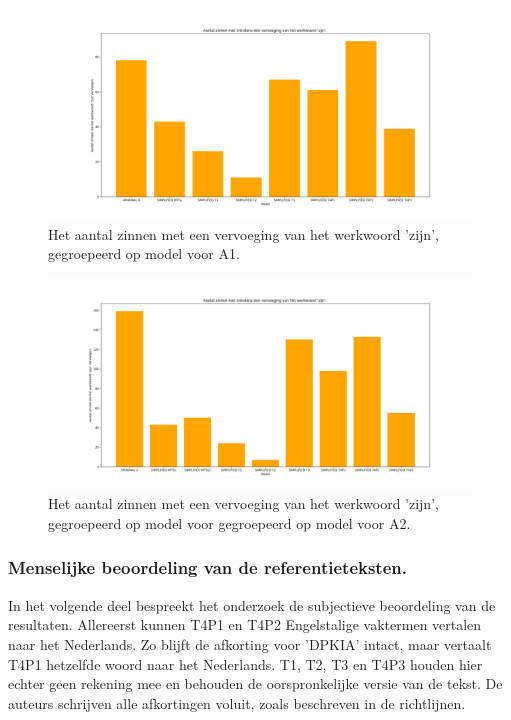 \begin{figure}[H]
	\includegraphics[width=\linewidth]{img/boxplot-tobe-a1.png}
	\caption{Het aantal zinnen met een vervoeging van het werkwoord 'zijn', gegroepeerd op model voor A1.}
	\label{img:histplot-tobe-a1}
\end{figure}

\begin{figure}[H]
	\includegraphics[width=\linewidth]{img/boxplot-tobe-a2.png}
	\caption{Het aantal zinnen met een vervoeging van het werkwoord 'zijn', gegroepeerd op model voor gegroepeerd op model voor A2.}
	\label{img:histplot-tobe-a2}
\end{figure}

\subsubsection{Menselijke beoordeling van de referentieteksten.}

In het volgende deel bespreekt het onderzoek de subjectieve beoordeling van de resultaten. Allereerst kunnen T4P1 en T4P2 Engelstalige vaktermen vertalen naar het Nederlands. Zo blijft de afkorting voor 'DPKIA' intact, maar vertaalt T4P1 hetzelfde woord naar het Nederlands.  T1, T2, T3 en T4P3 houden hier echter geen rekening mee en behouden de oorspronkelijke versie van de tekst. De auteurs schrijven alle afkortingen voluit, zoals beschreven in de richtlijnen.


